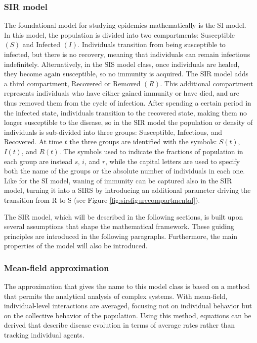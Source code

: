\subsubsection{SIR model}
\label{subsec:SIR}
The foundational model for studying epidemics mathematically is the SI model. In this model, the population is divided into two compartments: Susceptible $(S)$ and Infected $(I)$. Individuals transition from being susceptible to infected, but there is no recovery, meaning that individuals can remain infectious indefinitely. Alternatively, in the SIS model class, once individuals are healed, they become again susceptible, so no immunity is acquired.
The SIR model adds a third compartment, Recovered or Removed $(R)$. This additional compartment represents individuals who have either gained immunity or have died, and are thus removed them from the cycle of infection. After spending a certain period in the infected state, individuals transition to the recovered state, making them no longer susceptible to the disease, so in the SIR model the population or density of individuals is sub-divided into three groups: Susceptible, Infectious, and Recovered. At time $t$ the three groups are identified with the symbols: $S(t)$, $I(t)$, and $R(t)$. 
The symbols used to indicate the fractions of population in each group are instead $s$, $i$, and $r$, while the capital letters are used to specify both the name of the groups or the absolute number of individuals in each one. Like for the SI model, waning of immunity can be captured also in the SIR model, turning it into a SIRS by introducing an additional parameter driving the transition from R to S (see Figure \ref{fig:sirsfigurecompartmental}).

The SIR model, which will be described in the following sections, is built upon several assumptions that shape the mathematical framework. These guiding principles are introduced in the following paragraphs. Furthermore, the main properties of the model will also be introduced. 

\subsubsection{Mean-field approximation}
The approximation that gives the name to this model class is based on a method that permits the analytical analysis of complex systems. With mean-field, individual-level interactions are averaged, focusing not on individual behavior but on the collective behavior of the population. Using this method, equations can be derived that describe disease evolution in terms of average rates rather than tracking individual agents.
